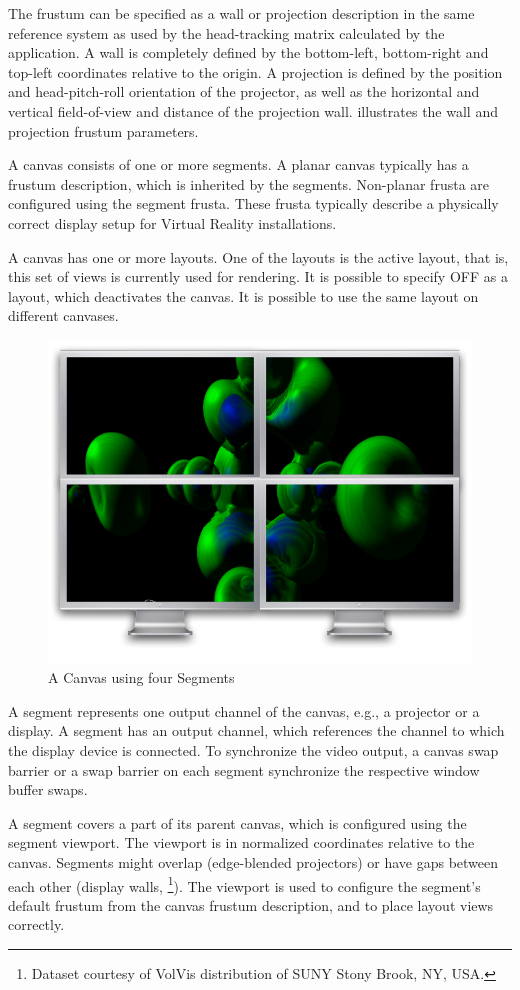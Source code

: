 The frustum can be specified as a wall or projection description in the same
reference system as used by the head-tracking matrix calculated by the
application.  A wall is completely defined by the bottom-left, bottom-right and
top-left coordinates relative to the origin.  A projection is defined by the
position and head-pitch-roll orientation of the projector, as well as the
horizontal and vertical field-of-view and distance of the projection wall.
 illustrates the wall and projection frustum parameters.

A canvas consists of one or more segments. A planar canvas typically has a
frustum description, which is inherited by the segments. Non-planar frusta are
configured using the segment frusta. These frusta typically describe a
physically correct display setup for Virtual Reality installations.

A canvas has one or more layouts. One of the layouts is the active
layout, that is, this set of views is currently used for rendering. It
is possible to specify \textsf{OFF} as a layout, which deactivates the
canvas. It is possible to use the same layout on different canvases.

\begin{figure}
 \includegraphics[width=.382\textwidth]{images/canvas.pdf}
 {\caption{\label{fCanvas}A Canvas using four Segments}}
\end{figure}

A \textsf{segment} represents one output channel of the canvas, e.g., a
projector or a display. A segment has an output channel, which references the
channel to which the display device is connected. To synchronize the video
output, a canvas swap barrier or a swap barrier on each segment synchronize the
respective window buffer swaps.

A segment covers a part of its parent canvas, which is configured using the
segment viewport. The viewport is in normalized coordinates relative to the
canvas. Segments might overlap (edge-blended projectors) or have gaps between
each other (display walls, \footnote{Dataset courtesy of VolVis
 distribution of SUNY Stony Brook, NY, USA.}). The viewport is used to
configure the segment's default frustum from the canvas frustum description, and
to place layout views correctly.

